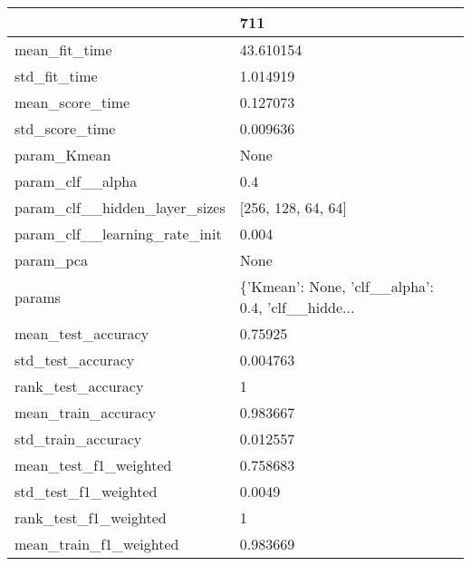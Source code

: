 \begin{tabular}{ll}
\toprule
{} &                                                711 \\
\midrule
mean\_fit\_time                 &                                          43.610154 \\
std\_fit\_time                  &                                           1.014919 \\
mean\_score\_time               &                                           0.127073 \\
std\_score\_time                &                                           0.009636 \\
param\_Kmean                   &                                               None \\
param\_clf\_\_alpha              &                                                0.4 \\
param\_clf\_\_hidden\_layer\_sizes &                                 [256, 128, 64, 64] \\
param\_clf\_\_learning\_rate\_init &                                              0.004 \\
param\_pca                     &                                               None \\
params                        &  \{'Kmean': None, 'clf\_\_alpha': 0.4, 'clf\_\_hidde... \\
mean\_test\_accuracy            &                                            0.75925 \\
std\_test\_accuracy             &                                           0.004763 \\
rank\_test\_accuracy            &                                                  1 \\
mean\_train\_accuracy           &                                           0.983667 \\
std\_train\_accuracy            &                                           0.012557 \\
mean\_test\_f1\_weighted         &                                           0.758683 \\
std\_test\_f1\_weighted          &                                             0.0049 \\
rank\_test\_f1\_weighted         &                                                  1 \\
mean\_train\_f1\_weighted        &                                           0.983669 \\

\end{tabular}
